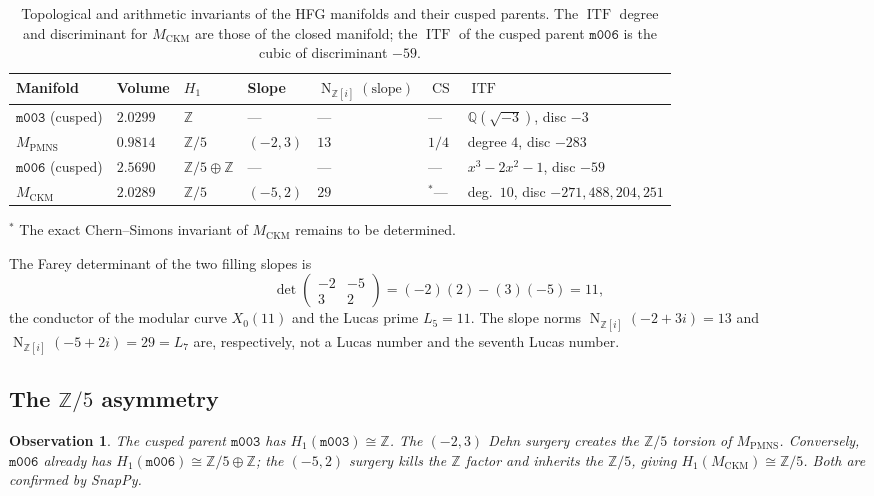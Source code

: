 \documentclass[11pt,a4paper]{article}
\newtheorem{observation}[theorem]{Observation}
\theoremstyle{definition}
\newcommand{\Z}{\mathbb{Z}}
\newcommand{\Q}{\mathbb{Q}}
\newcommand{\mfld}[1]{\texttt{#1}}
\newcommand{\CS}{\operatorname{CS}}
\newcommand{\ITF}{\operatorname{ITF}}
\newcommand{\N}{\operatorname{N}}
\begin{document}
\begin{table}[htbp]
\centering
\caption{Topological and arithmetic invariants of the HFG manifolds
and their cusped parents. The $\ITF$ degree and discriminant for
$M_{\mathrm{CKM}}$ are those of the closed manifold; the $\ITF$ of
the cusped parent $\mfld{m006}$ is the cubic of discriminant $-59$.}
\label{tab:invariants}
\small
\begin{tabular}{lllllll}
\toprule
Manifold & Volume & $H_1$ & Slope & $\N_{\Z[i]}(\text{slope})$
  & $\CS$ & $\ITF$ \\
\midrule
$\mfld{m003}$ (cusped) & $2.0299$ & $\Z$ & --- & ---
  & --- & $\Q(\sqrt{-3})$, disc $-3$ \\
$M_{\mathrm{PMNS}}$ & $0.9814$ & $\Z/5$ & $(-2,3)$ & $13$
  & $1/4$ & degree $4$, disc $-283$ \\
\addlinespace
$\mfld{m006}$ (cusped) & $2.5690$ & $\Z/5\oplus\Z$ & --- & ---
  & --- & $x^3{-}2x^2{-}1$, disc $-59$ \\
$M_{\mathrm{CKM}}$ & $2.0289$ & $\Z/5$ & $(-5,2)$ & $29$
  & ${}^{*}$--- & deg.\ $10$, disc $-271{,}488{,}204{,}251$ \\
\bottomrule
\end{tabular}
\smallskip
{\footnotesize$^*$ The exact Chern--Simons invariant of $M_{\mathrm{CKM}}$ remains to be determined.}
\end{table}

The Farey determinant of the two filling slopes is
\begin{equation}
\det\begin{pmatrix}-2 & -5\\3 & 2\end{pmatrix}
= (-2)(2)-(3)(-5) = 11,
\label{eq:farey}
\end{equation}
the conductor of the modular curve $X_0(11)$ and the Lucas prime
$L_5=11$. The slope norms $\N_{\Z[i]}(-2+3i)=13$ and
$\N_{\Z[i]}(-5+2i)=29=L_7$ are, respectively, not a Lucas number and
the seventh Lucas number.

\subsection{The $\Z/5$ asymmetry}
\label{sec:asymmetry}

\begin{observation}\label{obs:asymmetry}
The cusped parent $\mfld{m003}$ has $H_1(\mfld{m003})\cong\Z$.
The $(-2,3)$ Dehn surgery \emph{creates} the $\Z/5$ torsion of
$M_{\mathrm{PMNS}}$.
Conversely, $\mfld{m006}$ already has $H_1(\mfld{m006})\cong\Z/5\oplus\Z$;
the $(-5,2)$ surgery kills the $\Z$ factor and \emph{inherits} the
$\Z/5$, giving $H_1(M_{\mathrm{CKM}})\cong\Z/5$.
Both are confirmed by SnapPy.
\end{observation}
\end{document}
